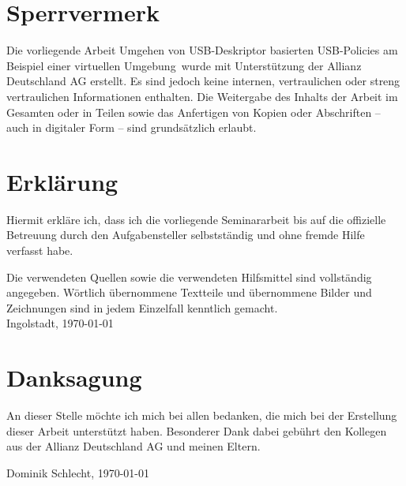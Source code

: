 

\chapter*{Sperrvermerk}
Die vorliegende Arbeit \glqq Umgehen von USB-Deskriptor basierten USB-Policies am Beispiel einer virtuellen Umgebung\grqq\ wurde mit Unterstützung der Allianz Deutschland AG erstellt. Es sind jedoch keine internen, vertraulichen oder streng vertraulichen Informationen enthalten. Die Weitergabe des Inhalts der Arbeit im Gesamten oder in Teilen sowie das Anfertigen von Kopien oder Abschriften -- auch in digitaler Form -- sind grunds\"{a}tzlich erlaubt.

\chapter*{Erkl\"{a}rung}
Hiermit erkl\"{a}re ich, dass ich die vorliegende Seminararbeit bis auf die offizielle Betreuung durch den Aufgabensteller selbstst\"{a}ndig und ohne fremde Hilfe verfasst habe.\par
Die verwendeten Quellen sowie die verwendeten Hilfsmittel sind vollst\"{a}ndig angegeben. W\"{o}rtlich \"{u}bernommene Textteile und \"{u}bernommene Bilder und Zeichnungen sind in jedem Einzelfall kenntlich gemacht. \\[10ex]
Ingolstadt, \today
{}

\chapter*{Danksagung}
An dieser Stelle möchte ich mich bei allen bedanken, die mich bei der Erstellung dieser Arbeit unterstützt haben. Besonderer Dank dabei gebührt den Kollegen aus der Allianz Deutschland AG und meinen Eltern.

\begin{flushright}
Dominik Schlecht, \today
\end{flushright}


